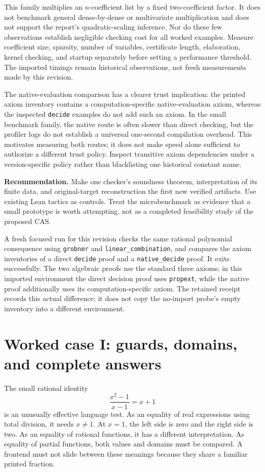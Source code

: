 \documentclass[11pt,letterpaper]{article}
\newcommand{\decision}[1]{\par\smallskip\textbf{Recommendation.} #1\par\smallskip}
\begin{document}
This family multiplies an \(n\)-coefficient list by a fixed two-coefficient
factor. It does not benchmark general dense-by-dense or multivariate
multiplication and does not support the report's quadratic-scaling inference.
Nor do these few observations establish negligible checking cost for all worked
examples. Measure coefficient size, sparsity, number of variables, certificate
length, elaboration, kernel checking, and startup separately before setting a
performance threshold. The imported timings remain historical observations,
not fresh measurements made by this revision.

The native-evaluation comparison has a clearer trust implication: the printed
axiom inventory contains a computation-specific native-evaluation axiom, whereas
the inspected \texttt{decide} examples do not add such an axiom. In the small
benchmark family, the native route is often slower than direct checking, but
the profiler logs do not establish a universal one-second compilation overhead.
This motivates
measuring both routes; it does not make speed alone sufficient to authorize a
different trust policy. Inspect transitive axiom dependencies under a
version-specific policy rather than blacklisting one historical constant name.

\decision{Make one checker's soundness theorem, interpretation of its finite
data, and original-target reconstruction the first new verified artifacts.
Use existing Lean tactics as controls. Treat the microbenchmark as evidence
that a small prototype is worth attempting, not as a completed feasibility
study of the proposed CAS.}

A fresh focused run for this revision checks the same rational polynomial
consequence using \texttt{grobner} and \texttt{linear\_combination}, and compares
the axiom inventories of a direct \texttt{decide} proof and a
\texttt{native\_decide} proof. It exits successfully. The two algebraic proofs
use the standard three axioms; in this imported environment the direct decision
proof uses \texttt{propext}, while the native proof additionally uses its
computation-specific axiom. The retained receipt records this actual difference;
it does not copy the no-import probe's empty inventory into a different environment.

\section{Worked case I: guards, domains, and complete answers}\label{sec:guards}
The small rational identity
\[
 \frac{x^2-1}{x-1}=x+1
\]
is an unusually effective language test. As an equality of real expressions
using total division, it needs \(x\ne1\). At \(x=1\), the left side is zero
and the right side is two. As an equality of rational functions, it has a
different interpretation. As equality of partial functions, both values and
domains must be compared. A frontend must not slide between these meanings
because they share a familiar printed fraction.
\end{document}
